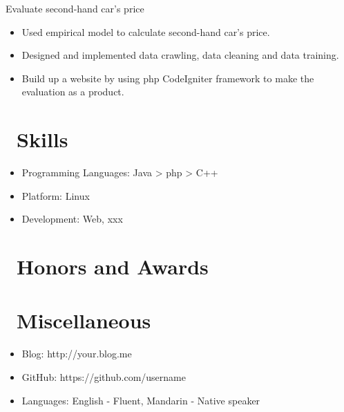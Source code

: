 \documentclass{resume}
\begin{document}
Evaluate second-hand car's price
\begin{itemize}
  \item Used empirical model to calculate second-hand car's price.
  \item Designed and implemented data crawling, data cleaning and data training. 
  \item Build up a website by using php CodeIgniter framework to make the evaluation as a product.
\end{itemize}

\section{\faCogs\ Skills}
\begin{itemize}[parsep=0.5ex]
  \item Programming Languages: Java > php > C++
  \item Platform: Linux
  \item Development: Web, xxx
\end{itemize}

\section{\faHeartO\ Honors and Awards}

\section{\faInfo\ Miscellaneous}
\begin{itemize}[parsep=0.5ex]
  \item Blog: http://your.blog.me
  \item GitHub: https://github.com/username
  \item Languages: English - Fluent, Mandarin - Native speaker
\end{itemize}

%
%
\end{document}
